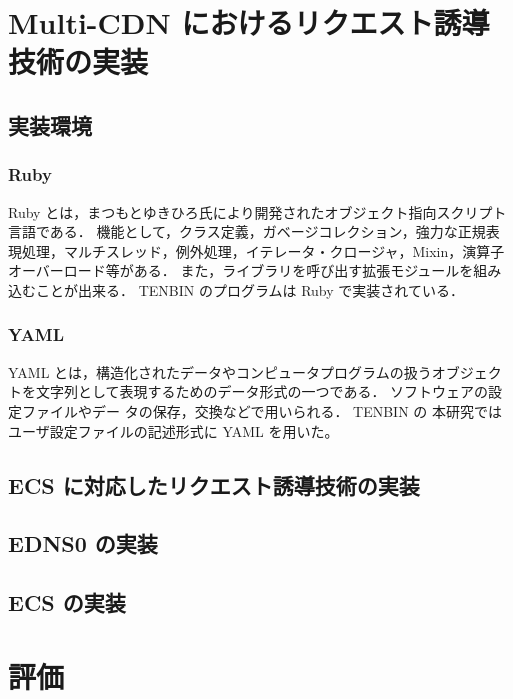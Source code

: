 \documentclass[a4j,12pt,onecolumn,oneside,titlepage,openany,final]{jreport}
\begin{document}
\chapter{Multi-CDN におけるリクエスト誘導技術の実装}\label{chap:Implement}

\section{実装環境}
\subsection{Ruby}
Ruby\cite{ruby} とは，まつもとゆきひろ氏により開発されたオブジェクト指向スクリプト言語である．
機能として，クラス定義，ガベージコレクション，強力な正規表現処理，マルチスレッド，例外処理，イテレータ・クロージャ，Mixin，演算子オーバーロード等がある．
また，ライブラリを呼び出す拡張モジュールを組み込むことが出来る．
TENBIN のプログラムは Ruby で実装されている．

\subsection{YAML}
YAML\cite{yaml} とは，構造化されたデータやコンピュータプログラムの扱うオブジェクトを文字列として表現するためのデータ形式の一つである．
ソフトウェアの設定ファイルやデー タの保存，交換などで用いられる．
TENBIN の
本研究ではユーザ設定ファイルの記述形式に YAML を用いた。


\section{ECS に対応したリクエスト誘導技術の実装}
\section{EDNS0 の実装}
\section{ECS の実装}

\chapter{評価}\label{chap:Evaluation}
\end{document}
